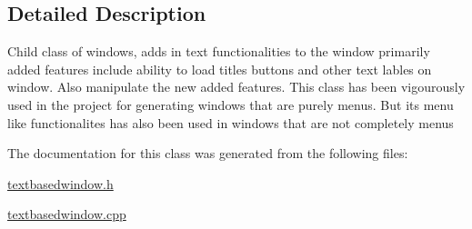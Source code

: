 \subsection{Detailed Description}
Child class of windows, adds in text functionalities to the window primarily added features include ability to load titles buttons and other text lables on window. Also manipulate the new added features. This class has been vigourously used in the project for generating windows that are purely menus. But its menu like functionalites has also been used in windows that are not completely menus 

The documentation for this class was generated from the following files\+:\begin{DoxyCompactItemize}
\item 
\hyperlink{textbasedwindow_8h}{textbasedwindow.\+h}\item 
\hyperlink{textbasedwindow_8cpp}{textbasedwindow.\+cpp}\end{DoxyCompactItemize}

